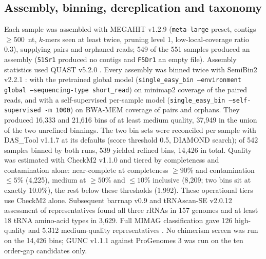 \documentclass[11pt]{article}
\begin{document}
\subsection*{Assembly, binning, dereplication and taxonomy}
Each sample was assembled with MEGAHIT v1.2.9 \citep{li2015megahit} (\texttt{meta-large} preset,
contigs $\geq 500$~nt, $k$-mers seen at least twice, pruning level 1, low-local-coverage ratio 0.3),
supplying pairs and orphaned reads; 549 of the 551 samples produced an assembly (\texttt{51Sr1}
produced no contigs and \texttt{F5Dr1} an empty file). Assembly statistics used QUAST v5.2.0
\citep{gurevich2013quast}. Every assembly was binned twice with SemiBin2 v2.2.1
\citep{pan2023semibin2}: with the pretrained global model (\texttt{single\_easy\_bin --environment
global --sequencing-type short\_read}) on minimap2 \citep{li2018minimap2} coverage of the paired
reads, and with a self-supervised per-sample model (\texttt{single\_easy\_bin --self-supervised -m
1000}) on BWA-MEM \citep{li2013bwamem} coverage of pairs and orphans. They produced 16{,}333 and
21{,}616 bins of at least medium quality, 37{,}949 in the union of the two unrefined binnings. The
two bin sets were reconciled per sample with DAS\_Tool v1.1.7 \citep{sieber2018dastool} at its
defaults (score threshold 0.5, DIAMOND search); of 542 samples binned by both runs, 539 yielded
refined bins, 14{,}426 in total. Quality was estimated with CheckM2 v1.1.0 \citep{chklovski2023checkm2}
and tiered by completeness and contamination alone: near-complete at completeness $\geq 90\%$ and
contamination $\leq 5\%$ (4{,}225), medium at $\geq 50\%$ and $\leq 10\%$ inclusive (8{,}209; two
bins sit at exactly 10.0\%), the rest below these thresholds (1{,}992). These operational tiers use CheckM2 alone. Subsequent barrnap v0.9 and tRNAscan-SE v2.0.12 \citep{chan2021trnascan} assessment of representatives found all three rRNAs in 157 genomes and at least 18 tRNA amino-acid types in 3{,}629. Full MIMAG classification gave 126 high-quality and 5{,}312 medium-quality representatives \citep{bowers2017mimag}. No chimerism screen was
run on the 14{,}426 bins; GUNC v1.1.1 \citep{orakov2021gunc} against ProGenomes 3 was run on the ten
order-gap candidates only.
\end{document}
